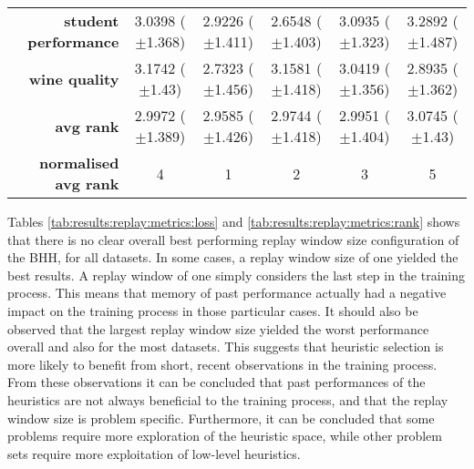 \begin{table}[htb]
{\begin{tabular}{r|ccccc}
			\textbf{student performance} & \cellcolor[rgb]{ 1,  .922,  .518}3.0398 ($\pm$1.368)    & \cellcolor[rgb]{ .812,  .867,  .506}2.9226 ($\pm$1.411) & \cellcolor[rgb]{ .388,  .745,  .482}2.6548 ($\pm$1.403) & \cellcolor[rgb]{ .996,  .812,  .498}3.0935 ($\pm$1.323) & \cellcolor[rgb]{ .973,  .412,  .42}3.2892 ($\pm$1.487)  \\
			\textbf{wine quality}        & \cellcolor[rgb]{ .973,  .412,  .42}3.1742 ($\pm$1.43)   & \cellcolor[rgb]{ .388,  .745,  .482}2.7323 ($\pm$1.456) & \cellcolor[rgb]{ .976,  .475,  .435}3.1581 ($\pm$1.418) & \cellcolor[rgb]{ 1,  .922,  .518}3.0419 ($\pm$1.356)    & \cellcolor[rgb]{ .706,  .835,  .498}2.8935 ($\pm$1.362) \\
			\midrule
			\textbf{avg rank}            & \cellcolor[rgb]{ 1,  .91,  .518}2.9972 ($\pm$1.389)     & \cellcolor[rgb]{ .388,  .745,  .482}2.9585 ($\pm$1.426) & \cellcolor[rgb]{ .651,  .82,  .494}2.9744 ($\pm$1.418)  & \cellcolor[rgb]{ 1,  .922,  .518}2.9951 ($\pm$1.404)    & \cellcolor[rgb]{ .973,  .412,  .42}3.0745 ($\pm$1.43)   \\
			\midrule
			\textbf{normalised avg rank} & \cellcolor[rgb]{ .988,  .667,  .471}4                   & \cellcolor[rgb]{ .388,  .745,  .482}1                   & \cellcolor[rgb]{ .694,  .831,  .498}2                   & \cellcolor[rgb]{ 1,  .922,  .518}3                      & \cellcolor[rgb]{ .973,  .412,  .42}5                    \\
		\end{tabular}%

	}
\end{table}%


Tables \ref{tab:results:replay:metrics:loss} and \ref{tab:results:replay:metrics:rank} shows that there is no clear overall best performing replay window size configuration of the \acs{BHH}, for all datasets. In some cases, a replay window size of one yielded the best results. A replay window of one simply considers the last step in the training process. This means that memory of past performance actually had a negative impact on the training process in those particular cases. It should also be observed that the largest replay window size yielded the worst performance overall and also for the most datasets. This suggests that heuristic selection is more likely to benefit from short, recent observations in the training process. From these observations it can be concluded that past performances of the heuristics are not always beneficial to the training process, and that the replay window size is problem specific. Furthermore, it can be concluded that some problems require more exploration of the heuristic space, while other problem sets require more exploitation of low-level heuristics.

